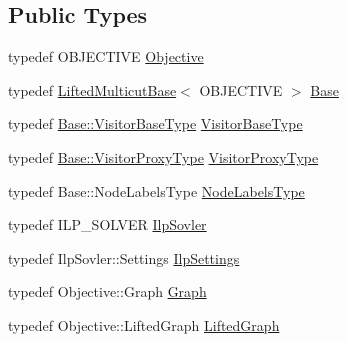 \subsection*{Public Types}
\begin{DoxyCompactItemize}
\item 
typedef O\+B\+J\+E\+C\+T\+I\+V\+E \hyperlink{classnifty_1_1graph_1_1lifted__multicut_1_1LiftedMulticutIlp_a9e7a118481038bcb5b4f1a41edd05b39}{Objective}
\item 
typedef \hyperlink{classnifty_1_1graph_1_1lifted__multicut_1_1LiftedMulticutBase}{Lifted\+Multicut\+Base}$<$ O\+B\+J\+E\+C\+T\+I\+V\+E $>$ \hyperlink{classnifty_1_1graph_1_1lifted__multicut_1_1LiftedMulticutIlp_a81b3d26f103b08b880d009dde5e6fc64}{Base}
\item 
typedef \hyperlink{classnifty_1_1graph_1_1optimization_1_1common_1_1SolverBase_a5a14d64c70a9cc0eebc7d71d2b089f9b}{Base\+::\+Visitor\+Base\+Type} \hyperlink{classnifty_1_1graph_1_1lifted__multicut_1_1LiftedMulticutIlp_a3d4b30d462387a88a2ca290c11112ed4}{Visitor\+Base\+Type}
\item 
typedef \hyperlink{classnifty_1_1graph_1_1optimization_1_1common_1_1SolverBase_a58913ea9ab9232ff72608b710c1012d0}{Base\+::\+Visitor\+Proxy\+Type} \hyperlink{classnifty_1_1graph_1_1lifted__multicut_1_1LiftedMulticutIlp_a4b6c6a7510ed7dff44329443a72b3f77}{Visitor\+Proxy\+Type}
\item 
typedef Base\+::\+Node\+Labels\+Type \hyperlink{classnifty_1_1graph_1_1lifted__multicut_1_1LiftedMulticutIlp_adc3cc80eb39cbab34f157892edbb8b51}{Node\+Labels\+Type}
\item 
typedef I\+L\+P\+\_\+\+S\+O\+L\+V\+E\+R \hyperlink{classnifty_1_1graph_1_1lifted__multicut_1_1LiftedMulticutIlp_abb75426c93adf0ef05ce4a38004dbaef}{Ilp\+Sovler}
\item 
typedef Ilp\+Sovler\+::\+Settings \hyperlink{classnifty_1_1graph_1_1lifted__multicut_1_1LiftedMulticutIlp_a1660192dd643891762ce8f0e576a7053}{Ilp\+Settings}
\item 
typedef Objective\+::\+Graph \hyperlink{classnifty_1_1graph_1_1lifted__multicut_1_1LiftedMulticutIlp_a9bb8c61f3507a562468d329a243d0603}{Graph}
\item 
typedef Objective\+::\+Lifted\+Graph \hyperlink{classnifty_1_1graph_1_1lifted__multicut_1_1LiftedMulticutIlp_a754b340c90447fa603a1d05c0ce0aa72}{Lifted\+Graph}
\end{DoxyCompactItemize}
